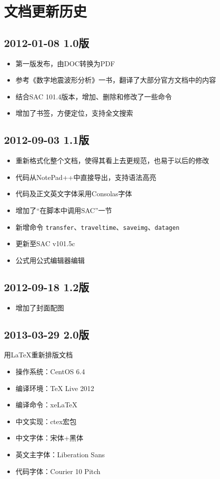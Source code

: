 \section{文档更新历史}
\subsection*{2012-01-08 1.0版}
\begin{itemize}
\item 第一版发布，由DOC转换为PDF
\item 参考《数字地震波形分析》一书，翻译了大部分官方文档中的内容
\item 结合SAC 101.4版本，增加、删除和修改了一些命令
\item 增加了书签，方便定位，支持全文搜索
\end{itemize}

\subsection*{2012-09-03 1.1版}
\begin{itemize}
\item 重新格式化整个文档，使得其看上去更规范，也易于以后的修改
\item 代码从NotePad++中直接导出，支持语法高亮
\item 代码及正文英文字体采用Consolas字体
\item 增加了``在脚本中调用SAC''一节
\item 新增命令 \verb+transfer+、\verb+traveltime+、\verb+saveimg+、\verb+datagen+
\item 更新至SAC v101.5c
\item 公式用公式编辑器编辑
\end{itemize}

\subsection*{2012-09-18 1.2版}
\begin{itemize}
\item 增加了封面配图
\end{itemize}

\subsection*{2013-03-29 2.0版}
用LaTeX重新排版文档
\begin{itemize}
\item 操作系统：CentOS 6.4
\item 编译环境：TeX Live 2012
\item 编译命令：xeLaTeX
\item 中文实现：ctex宏包
\item 中文字体：宋体+黑体
\item 英文主字体：Liberation Sans
\item 代码字体：Courier 10 Pitch
\end{itemize}

